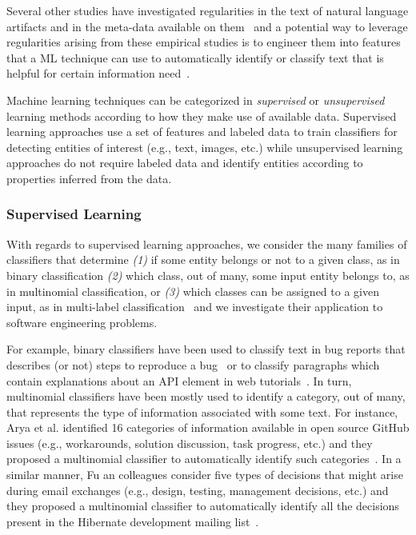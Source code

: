 Several other studies have investigated regularities in the text 
of natural language artifacts and 
in the meta-data available on them~\cite{Ko2006, Maalej2013, Arya2019}
and a potential way to leverage regularities arising from these empirical studies
is to engineer them into 
features that a  \acf{ML} technique can use to automatically identify or classify
text that is helpful for certain information need~\cite{Bavota2016}. 



Machine learning techniques can be categorized 
in \textit{supervised} or \textit{unsupervised} learning methods 
according to how they make use of available data. 
Supervised learning approaches use a set of features and labeled data
to train classifiers for detecting entities of interest (e.g., text, images, etc.)
while unsupervised learning approaches do not require labeled data and 
identify entities according to properties inferred from the data.



\subsubsection{Supervised Learning }
\label{cp2:supervised}


With regards to supervised learning approaches, 
we consider the many families of classifiers that 
determine
\textit{(1)} if some entity belongs or not to a given class, as in binary classification
\textit{(2)} which class, out of many, some input entity belongs to, as in multinomial classification, or
\textit{(3)} which classes can be assigned to a given input, as in multi-label classification~\cite{alpaydin2020ml}
and we investigate their application to software engineering problems.





For example, binary classifiers have been used 
to classify text in bug reports that describes (or not) steps to reproduce a bug~\cite{Chaparro2016}
or  to classify paragraphs which contain explanations 
about an API element  in web tutorials~\cite{Petrosyan2015}.
In turn, multinomial classifiers have been mostly used 
to identify a category, out of many, that represents the type of information 
associated with some text. For instance, Arya et al. identified 16 categories of  information available
in open source GitHub issues (e.g., workarounds, solution discussion, task progress, etc.)
and they proposed a multinomial classifier 
to automatically identify such categories~\cite{Arya2019}.
In a similar manner, Fu an colleagues consider 
five types of decisions that might arise during 
email exchanges (e.g., design, testing, management decisions, etc.)
and they proposed a multinomial classifier 
to automatically identify all the decisions present in 
the Hibernate development mailing list~\cite{fu2021}.





